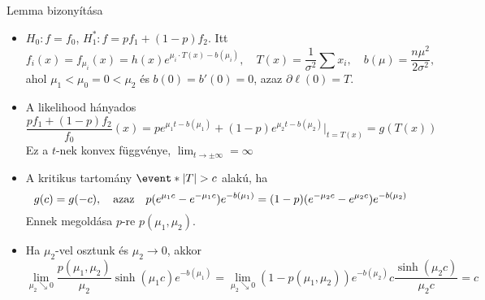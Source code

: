 \documentclass[aspectratio=169,notheorems,9pt,\option]{beamer}
\begin{document}
  \begin{frame}{Lemma bizonyítása}
    \begin{itemize}
    \item $H_0:f=f_0$, $H_1^*:f=pf_1+ (1-p)f_2$. Itt
      \begin{displaymath}
        f_i (x) = f_{\mu_i} (x)= h (x)e^{\mu_i\cdot T(x) - b (\mu_i)},
        \quad 
        T(x)=\frac{1}{\sigma^2}\sum x_i,
        \quad
        b(\mu)=\frac{n\mu^2}{2\sigma^2},
      \end{displaymath}
      ahol $\mu_1<\mu_0=0<\mu_2$ és $b (0)=b' (0)=0$, azaz $\partial\ell (0)=T$.
    \item A likelihood hányados 
      \begin{displaymath}
        \frac{pf_1+ (1-p)f_2}{f_0} (x) 
        =p e^{\mu_1 t-b (\mu_1)}+(1-p)e^{\mu_2 t-b (\mu_2)}|_{t=T (x)}=g (T (x))
      \end{displaymath}
      Ez a $t$-nek konvex függvénye, $\lim_{t\to\pm\infty} =\infty$
    \item A kritikus tartomány $\event*{\abs*{T}>c}$ alakú, ha
      \begin{displaymath}
        g (c)=g (-c),\quad\text{azaz}\quad
        p(e^{\mu_1 c}-e^{-\mu_1c})e^{-b (\mu_1)}
        = (1-p)(e^{-\mu_2 c}-e^{\mu_2c})e^{-b (\mu_2)}
      \end{displaymath}
      Ennek megoldása $p$-re $p (\mu_1,\mu_2)$.
    \item Ha $\mu_2$-vel osztunk és $\mu_2\to0$, akkor
      \begin{displaymath}
        \lim_{\mu_2\searrow0}\frac{p (\mu_1,\mu_2)}{\mu_2} \sinh(\mu_1c)e^{-b(\mu_1)}
        = \lim_{\mu_2\searrow0} (1-p(\mu_1,\mu_2)) e^{-b (\mu_2)} c\frac{\sinh (\mu_2c)}{\mu_2 c}
        = c
      \end{displaymath}
    \end{itemize}
  \end{frame}
\end{document}
